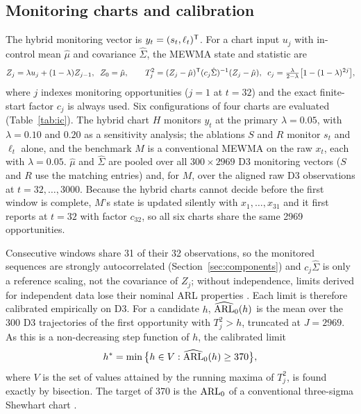\subsection{Monitoring charts and calibration}

The hybrid monitoring vector is $y_t=(s_t,\ell_t)^{\mathsf T}$. For a chart input $u_j$ with in-control mean $\hat\mu$ and covariance $\hat\Sigma$, the MEWMA state
and statistic are \citep{lowry_multivariate_1992}
\begin{equation}
Z_j=\lambda u_j+(1-\lambda)Z_{j-1},\;\; Z_0=\hat\mu,\qquad
T_j^2=(Z_j-\hat\mu)^{\mathsf T}(c_j\hat\Sigma)^{-1}(Z_j-\hat\mu),\;\;
c_j=\tfrac{\lambda}{2-\lambda}\big[1-(1-\lambda)^{2j}\big],
\label{eq:mewma}
\end{equation}
where $j$ indexes monitoring opportunities ($j=1$ at $t=32$) and the exact finite-start factor
$c_j$ is always used. Six configurations of four charts are evaluated (Table~\ref{tab:ic}). The
hybrid chart $H$ monitors $y_t$ at the primary $\lambda=0.05$, with $\lambda=0.10$ and $0.20$ as a
sensitivity analysis; the ablations $S$ and $R$ monitor $s_t$ and $\ell_t$ alone, and the benchmark
$M$ is a conventional MEWMA on the raw $x_t$, each with $\lambda=0.05$. $\hat\mu$ and
$\hat\Sigma$ are pooled over all $300\times2969$ D3 monitoring vectors ($S$ and $R$ use the matching
entries) and, for $M$, over the aligned raw D3 observations at $t=32,\dots,3000$. Because the hybrid
charts cannot decide before the first window is complete, $M$'s state is updated silently with
$x_1,\dots,x_{31}$ and it first reports at $t=32$ with factor $c_{32}$, so all six charts share the
same 2969 opportunities.

Consecutive windows share 31 of their 32 observations, so the monitored sequences are strongly
autocorrelated (Section~\ref{sec:components}) and $c_j\hat\Sigma$ is only a reference scaling, not
the covariance of $Z_j$; without independence, limits derived for independent data lose their
nominal ARL properties \citep{lowry_multivariate_1992}. Each limit is therefore calibrated
empirically on D3. For a candidate $h$, $\widehat{\mathrm{ARL}}_0(h)$ is the mean over the 300 D3
trajectories of the first opportunity with $T_j^2>h$, truncated at $J=2969$. As this is a
non-decreasing step function of $h$, the calibrated limit
\begin{equation}
h^*=\min\big\{h\in V:\widehat{\mathrm{ARL}}_0(h)\ge370\big\},
\label{eq:limit}
\end{equation}
where $V$ is the set of values attained by the running maxima of $T_j^2$, is found exactly by
bisection. The target of 370 is the $\mathrm{ARL}_0$ of a conventional three-sigma Shewhart chart
\citep{ahmed_statistical_2017}.

